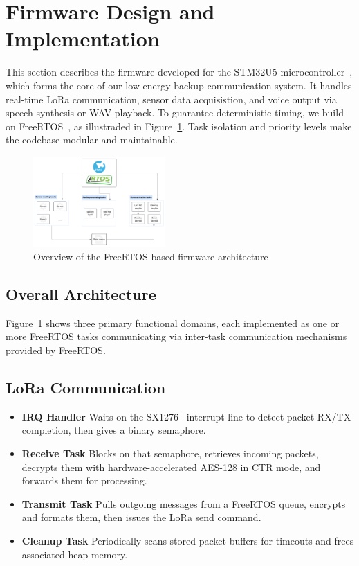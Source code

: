 \section{Firmware Design and Implementation}

This section describes the firmware developed for the STM32U5 microcontroller~\cite{stm32u5}, which forms the core of our low-energy backup communication system. It handles real-time LoRa communication, sensor data acquisistion, and voice output via speech synthesis or WAV playback. To guarantee deterministic timing, we build on FreeRTOS~\cite{freertos}, as illustraded in Figure~\ref{fig:firmware-system}. Task isolation and priority levels make the codebase modular and maintainable.

\begin{figure}[H]
\centering
\includegraphics[width=0.45\textwidth]{images/firmware-system-design.png}
\caption{Overview of the FreeRTOS-based firmware architecture}\label{fig:firmware-system}
\end{figure}

\subsection{Overall Architecture}

Figure~\ref{fig:firmware-system} shows three primary functional domains, each implemented as one or more FreeRTOS tasks communicating via inter-task communication mechanisms provided by FreeRTOS.

\subsection{LoRa Communication}
\begin{itemize}
  \item \textbf{IRQ Handler}
    Waits on the SX1276~\cite{sx1276} interrupt line to detect packet RX/TX completion, then gives a binary semaphore.
  \item \textbf{Receive Task}
    Blocks on that semaphore, retrieves incoming packets, decrypts them with hardware-accelerated AES-128 in CTR mode, and forwards them for processing.  
  \item \textbf{Transmit Task}
    Pulls outgoing messages from a FreeRTOS queue, encrypts and formats them, then issues the LoRa send command.
  \item \textbf{Cleanup Task}
    Periodically scans stored packet buffers for timeouts and frees associated heap memory.
\end{itemize}

